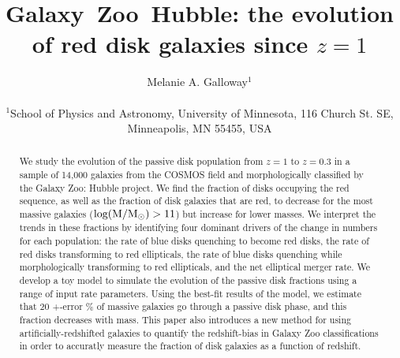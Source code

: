 \documentclass[useAMS,usenatbib]{mn2e}
\begin{document}
\title[Galaxy~Zoo: passive disk fraction]{Galaxy~Zoo~Hubble: the evolution of red disk galaxies since $z=1$}
\author[Galloway et~al.]{\parbox[t]{16cm}{Melanie A. Galloway$^1$
\vspace{0.1in} }\\
$^{1}$School of Physics and Astronomy, University of Minnesota, 116 Church St. SE, Minneapolis, MN 55455, USA\\
   }
\maketitle

\begin{abstract}
We study the evolution of the passive disk population from $z=1$ to $z=0.3$ in a sample of 14,000 galaxies from the COSMOS field and morphologically classified by the Galaxy Zoo: Hubble project. We find the fraction of disks occupying the red sequence, as well as the fraction of disk galaxies that are red, to decrease for the most massive galaxies ($\rm log(M/M_{\odot})>11$) but increase for lower masses. We interpret the trends in these fractions by identifying four dominant drivers of the change in numbers for each population: the rate of blue disks quenching to become red disks, the rate of red disks transforming to red ellipticals, the rate of blue disks quenching while morphologically transforming to red ellipticals, and the net elliptical merger rate. We develop a toy model to simulate the evolution of the passive disk fractions using a range of input rate parameters. Using the best-fit results of the model, we estimate that 20 +-error \% of massive galaxies go through a passive disk phase, and this fraction decreases with mass. This paper also introduces a new method for using artificially-redshifted galaxies to quantify the redshift-bias in Galaxy Zoo classifications in order to accuratly measure the fraction of disk galaxies as a function of redshift.  

\end{abstract}
\end{document}
